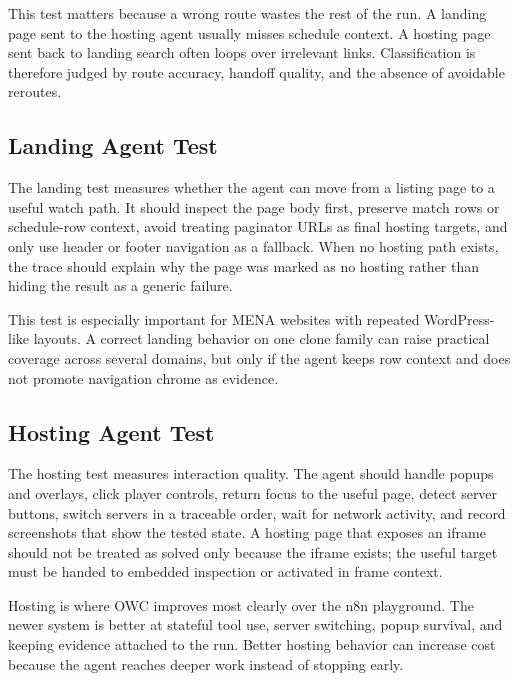 This test matters because a wrong route wastes the rest of the run. A landing page sent
to the hosting agent usually misses schedule context. A hosting page sent back to
landing search often loops over irrelevant links. Classification is therefore judged by
route accuracy, handoff quality, and the absence of avoidable reroutes.

\subsection{Landing Agent Test}

The landing test measures whether the agent can move from a listing page to a useful
watch path. It should inspect the page body first, preserve match rows or schedule-row
context, avoid treating paginator URLs as final hosting targets, and only use header or
footer navigation as a fallback. When no hosting path exists, the trace should explain
why the page was marked as no hosting rather than hiding the result as a generic
failure.



This test is especially important for MENA websites with repeated WordPress-like
layouts. A correct landing behavior on one clone family can raise practical coverage
across several domains, but only if the agent keeps row context and does not promote
navigation chrome as evidence.

\subsection{Hosting Agent Test}

The hosting test measures interaction quality. The agent should handle popups and
overlays, click player controls, return focus to the useful page, detect server
buttons, switch servers in a traceable order, wait for network activity, and record
screenshots that show the tested state. A hosting page that exposes an iframe should not
be treated as solved only because the iframe exists; the useful target must be handed to
embedded inspection or activated in frame context.



Hosting is where OWC improves most clearly over the n8n playground. The newer system is
better at stateful tool use, server switching, popup survival, and keeping evidence
attached to the run. Better hosting behavior can increase cost because the agent reaches
deeper work instead of stopping early.

